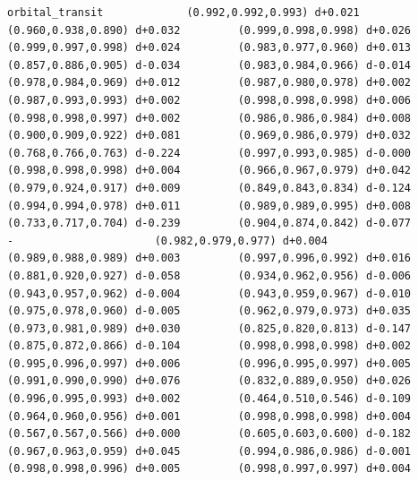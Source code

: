 \documentclass[11pt, letterpaper, openany]{book}
\begin{document}
\begin{empiricalbox}
\begin{lstlisting}[style=terminal]
orbital_transit             (0.992,0.992,0.993) d+0.021         (0.960,0.938,0.890) d+0.032         (0.999,0.998,0.998) d+0.026         (0.999,0.997,0.998) d+0.024         (0.983,0.977,0.960) d+0.013         (0.857,0.886,0.905) d-0.034         (0.983,0.984,0.966) d-0.014         (0.978,0.984,0.969) d+0.012         (0.987,0.980,0.978) d+0.002         (0.987,0.993,0.993) d+0.002         (0.998,0.998,0.998) d+0.006         (0.998,0.998,0.997) d+0.002         (0.986,0.986,0.984) d+0.008         (0.900,0.909,0.922) d+0.081         (0.969,0.986,0.979) d+0.032         (0.768,0.766,0.763) d-0.224         (0.997,0.993,0.985) d-0.000         (0.998,0.998,0.998) d+0.004         (0.966,0.967,0.979) d+0.042         (0.979,0.924,0.917) d+0.009         (0.849,0.843,0.834) d-0.124         (0.994,0.994,0.978) d+0.011         (0.989,0.989,0.995) d+0.008         (0.733,0.717,0.704) d-0.239         (0.904,0.874,0.842) d-0.077                      -                      (0.982,0.979,0.977) d+0.004         (0.989,0.988,0.989) d+0.003         (0.997,0.996,0.992) d+0.016         (0.881,0.920,0.927) d-0.058         (0.934,0.962,0.956) d-0.006         (0.943,0.957,0.962) d-0.004         (0.943,0.959,0.967) d-0.010         (0.975,0.978,0.960) d-0.005         (0.962,0.979,0.973) d+0.035         (0.973,0.981,0.989) d+0.030         (0.825,0.820,0.813) d-0.147         (0.875,0.872,0.866) d-0.104         (0.998,0.998,0.998) d+0.002         (0.995,0.996,0.997) d+0.006         (0.996,0.995,0.997) d+0.005         (0.991,0.990,0.990) d+0.076         (0.832,0.889,0.950) d+0.026         (0.996,0.995,0.993) d+0.002         (0.464,0.510,0.546) d-0.109         (0.964,0.960,0.956) d+0.001         (0.998,0.998,0.998) d+0.004         (0.567,0.567,0.566) d+0.000         (0.605,0.603,0.600) d-0.182         (0.967,0.963,0.959) d+0.045         (0.994,0.986,0.986) d-0.001         (0.998,0.998,0.996) d+0.005         (0.998,0.997,0.997) d+0.004     

\end{lstlisting}
\end{empiricalbox}
\end{document}
